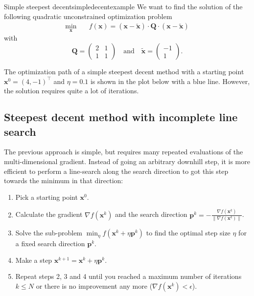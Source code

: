\begin{example}{Simple steepest decent}{simpledecentexample}
    We want to find the solution of the following quadratic unconstrained optimization problem
    \begin{equation}
        \begin{aligned}
            \min_{\mathbf{x}} \quad & f(\mathbf{x})= (\mathbf{x}-\tilde{\mathbf{x}}) \cdot \mathbf{Q} \cdot (\mathbf{x}-\tilde{\mathbf{x}})
        \end{aligned}
        \label{eq:simpledecent_example}
    \end{equation}
    with 
    \begin{equation}
        \mathbf{Q} = 
        \begin{pmatrix}
        2 & 1 \\
        1 & 1 
        \end{pmatrix}
        \quad \text{and} \quad
        \tilde{\mathbf{x}} = 
        \begin{pmatrix}
        -1\\
        1 
        \end{pmatrix}
        .
    \end{equation}

    The optimization path of a simple steepest decent method with a starting point $\mathbf{x}^0= (4, -1)^\top$ and $\eta=0.1$ is shown in the plot below with a blue line. However, the solution requires quite a lot of iterations.

    \begin{center}
        
    \end{center}   
\end{example}

\subsection{Steepest decent method with incomplete line search}
The previous approach is simple, but requires many repeated evaluations of the multi-dimensional gradient. Instead of going an arbitrary downhill step, it is more efficient to perform a line-search along the search direction to got this step towards the minimum in that direction: 
\begin{enumerate}
    \item Pick a starting point $\mathbf{x}^0$.
    \item Calculate the gradient $\nabla f(\mathbf{x}^k)$ and the search direction $\mathbf{p}^k = - \frac{\nabla f(\mathbf{x}^k)}{\lVert \nabla f(\mathbf{x}^k) \rVert}$.
    \item Solve the sub-problem $\min_{\eta} f(\mathbf{x}^k + \eta \mathbf{p}^k)$ to find the optimal step size $\eta$ for a fixed search direction $\mathbf{p}^k$.
    \item Make a step $\mathbf{x}^{k+1} = \mathbf{x}^k + \eta \mathbf{p}^k$.
    \item Repeat steps 2, 3 and 4 until you reached a maximum number of iterations $k \le N$ or there is no improvement any more ($ \nabla f(\mathbf{x}^k) < \epsilon$). 
\end{enumerate}

